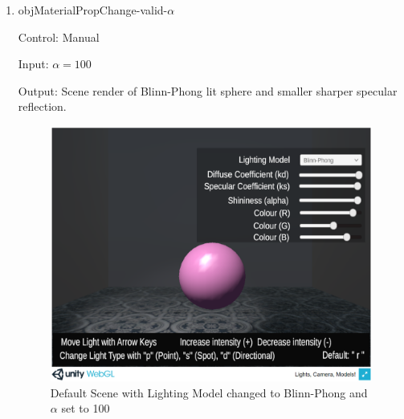 \documentclass[12pt, titlepage]{article}
\begin{document}
\begin{enumerate}
%	
%	
%	
%	
%	
%
%	
%	
%	
%	
%	

	\item{objMaterialPropChange-valid-$\alpha$\\}

	Control: Manual
	
	Input: $\alpha = 100$
	
	Output: Scene render of Blinn-Phong lit sphere and smaller sharper specular 
	reflection.
	\begin{figure}[h]
	\centering
		\includegraphics[scale=0.25]{./images/sphere-lit-blinnphong-a100}
		\caption{Default Scene with Lighting Model changed to Blinn-Phong and 
			$\alpha$ set to 100}
		\label{fig:blinnPhong-a100}
	\end{figure}		
	

\end{enumerate}
\end{document}
